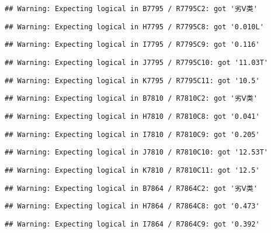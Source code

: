 \documentclass[
]{article}
\begin{document}
\begin{verbatim}
## Warning: Expecting logical in B7795 / R7795C2: got '劣Ⅴ类'
\end{verbatim}

\begin{verbatim}
## Warning: Expecting logical in H7795 / R7795C8: got '0.010L'
\end{verbatim}

\begin{verbatim}
## Warning: Expecting logical in I7795 / R7795C9: got '0.116'
\end{verbatim}

\begin{verbatim}
## Warning: Expecting logical in J7795 / R7795C10: got '11.03T'
\end{verbatim}

\begin{verbatim}
## Warning: Expecting logical in K7795 / R7795C11: got '10.5'
\end{verbatim}

\begin{verbatim}
## Warning: Expecting logical in B7810 / R7810C2: got '劣Ⅴ类'
\end{verbatim}

\begin{verbatim}
## Warning: Expecting logical in H7810 / R7810C8: got '0.041'
\end{verbatim}

\begin{verbatim}
## Warning: Expecting logical in I7810 / R7810C9: got '0.205'
\end{verbatim}

\begin{verbatim}
## Warning: Expecting logical in J7810 / R7810C10: got '12.53T'
\end{verbatim}

\begin{verbatim}
## Warning: Expecting logical in K7810 / R7810C11: got '12.5'
\end{verbatim}

\begin{verbatim}
## Warning: Expecting logical in B7864 / R7864C2: got '劣Ⅴ类'
\end{verbatim}

\begin{verbatim}
## Warning: Expecting logical in H7864 / R7864C8: got '0.473'
\end{verbatim}

\begin{verbatim}
## Warning: Expecting logical in I7864 / R7864C9: got '0.392'
\end{verbatim}
\end{document}
